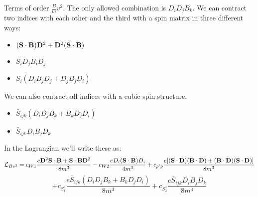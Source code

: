 Terms of order $\frac{B}{m} v^2$.  The only allowed combination is $D_i D_j B_k$.  We can contract two indices with each other and the third with a spin matrix in three different ways:
\begin{itemize}
	\item $(\mathbf{S} \cdot \mathbf{B}) \mathbf{D}^2 +  \mathbf{D}^2 (\mathbf{S} \cdot \mathbf{B})$
	\item $S_i D_j B_i D_j$
	\item $S_i (D_i B_j D_j + D_j B_j D_i)$
\end{itemize}
We can also contract all indices with a cubic spin structure:
\begin{itemize}
  \item $\bar{S}_{ijk} (D_i D_j B_k + B_k D_j D_i)$
  \item $\bar{S}_{ijk} D_i B_j D_k$
\end{itemize}

In the Lagrangian we'll write these as:
\[
	\mathcal{L}_{Bv^2} =
		c_{W1} \frac{ e \mathbf{D}^2 \mathbf{S} \cdot \mathbf{B} + \mathbf{S} \cdot \mathbf{B} \mathbf{D}^2 }{8m^3}
		- c_{W2} \frac{e D_i (\mathbf{S} \cdot \mathbf{B}) D_i}{4m^3}
		+c_{p'p} \frac{ e [ (\mathbf{S}\cdot \mathbf{D})(\mathbf{B} \cdot \mathbf{D}) + (\mathbf{B} \cdot \mathbf{D})(\mathbf{S}\cdot \mathbf{D})]}{8m^3}
\]\[		+ c_{S^3_1} \frac{ e \bar{S}_{ijk} (D_i D_j B_k + B_k D_j D_i)}{8m^3}
		+ c_{S^3_2} \frac{ e \bar{S}_{ijk} D_i B_j D_k }{8m^3}
\]





